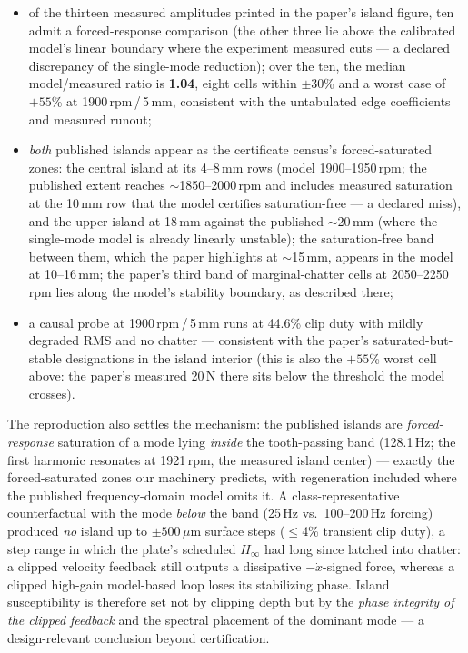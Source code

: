 \documentclass[preprint,12pt]{elsarticle}
\newcommand{\hinf}{\ensuremath{H_\infty}}
\newcommand{\um}{\,\ensuremath{\mu\mathrm{m}}}
\begin{document}
\begin{itemize}
\item of the thirteen measured amplitudes printed in the paper's
island figure, ten admit a forced-response comparison (the other
three lie above the calibrated model's linear boundary where the
experiment measured cuts --- a declared discrepancy of the
single-mode reduction); over the ten, the median model/measured ratio
is \textbf{1.04}, eight cells within $\pm30$\% and a worst case of
$+55$\% at 1900\,rpm\,/\,5\,mm, consistent with the untabulated edge
coefficients and measured runout;
\item \emph{both} published islands appear as the certificate
census's forced-saturated zones: the central island at its
4--8\,mm rows (model 1900--1950\,rpm; the published extent reaches
$\sim$1850--2000\,rpm and includes measured saturation at the
10\,mm row that the model certifies saturation-free --- a declared
miss), and the upper island at 18\,mm against the published
$\sim$20\,mm (where the single-mode model is already linearly
unstable); the saturation-free band between them, which the paper
highlights at $\sim$15\,mm, appears in the model at 10--16\,mm; the
paper's third band of marginal-chatter cells at 2050--2250\,rpm lies
along the model's stability boundary, as described there;
\item a causal probe at 1900\,rpm\,/\,5\,mm runs at 44.6\% clip duty
with mildly degraded RMS and no chatter --- consistent with the
paper's saturated-but-stable designations in the island interior
(this is also the $+55$\% worst cell above: the paper's measured
20\,N there sits below the threshold the model crosses).
\end{itemize}

The reproduction also settles the mechanism: the published islands
are \emph{forced-response} saturation of a mode lying \emph{inside}
the tooth-passing band (128.1\,Hz; the first harmonic resonates at
1921\,rpm, the measured island center) --- exactly the
forced-saturated zones our machinery predicts, with regeneration
included where the published frequency-domain model omits it. A
class-representative counterfactual with the mode \emph{below} the
band (25\,Hz vs.\ 100--200\,Hz forcing) produced \emph{no} island up
to $\pm500\um$ surface steps ($\le$4\% transient clip duty), a step
range in which the plate's scheduled \hinf{} had long since latched
into chatter: a clipped velocity feedback still outputs a
dissipative $-\dot x$-signed force, whereas a clipped high-gain
model-based loop loses its stabilizing phase. Island susceptibility
is therefore set not by clipping depth but by the \emph{phase
integrity of the clipped feedback} and the spectral placement of the
dominant mode --- a design-relevant conclusion beyond certification.



\end{document}
